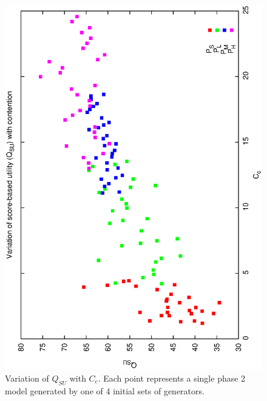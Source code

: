 \documentclass[12pt,a4paper]{article}
\begin{document}
{\begin{figure}[h]
\begin{center}
 \includegraphics[scale=0.5, angle=-90]{figures/p2_gen_qsu.eps}
 \caption[Variation of $Q_{SU}$ with $C_C$ for variable phase2 generator models.] 
   {Variation of $Q_{SU}$ with $C_c$. Each point represents a single phase 2 model generated by one of 4 initial sets of generators.}
\label{fig:p2_gen_su}
\end{center}
\end{figure}


\begin{figure}[h]


\end{figure}}
\end{document}
